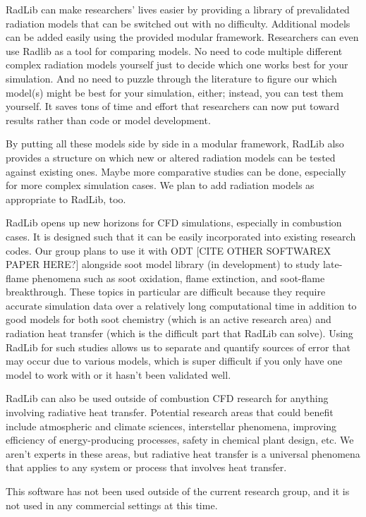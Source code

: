 \documentclass[preprint,12pt, a4paper]{elsarticle}
\begin{document}
RadLib can make researchers' lives easier by providing a library of prevalidated radiation models that can be switched out with no difficulty. Additional models can be added easily using the provided modular framework. Researchers can even use Radlib as a tool for comparing models. No need to code multiple different complex radiation models yourself just to decide which one works best for your simulation. And no need to puzzle through the literature to figure our which model(s) might be best for your simulation, either; instead, you can test them yourself. It saves tons of time and effort that researchers can now put toward results rather than code or model development. 

By putting all these models side by side in a modular framework, RadLib also provides a structure on which new or altered radiation models can be tested against existing ones. Maybe more comparative studies can be done, especially for more complex simulation cases. We plan to add radiation models as appropriate to RadLib, too. 

RadLib opens up new horizons for CFD simulations, especially in combustion cases. It is designed such that it can be easily incorporated into existing research codes. Our group plans to use it with ODT [CITE OTHER SOFTWAREX PAPER HERE?] alongside soot model library (in development) to study late-flame phenomena such as soot oxidation, flame extinction, and soot-flame breakthrough. These topics in particular are difficult because they require accurate simulation data over a relatively long computational time in addition to good models for both soot chemistry (which is an active research area) and radiation heat transfer (which is the difficult part that RadLib can solve). Using RadLib for such studies allows us to separate and quantify sources of error that may occur due to various models, which is super difficult if you only have one model to work with or it hasn't been validated well. 

RadLib can also be used outside of combustion CFD research for anything involving radiative heat transfer. Potential research areas that could benefit include atmospheric and climate sciences, interstellar phenomena, improving efficiency of energy-producing processes, safety in chemical plant design, etc. We aren't experts in these areas, but radiative heat transfer is a universal phenomena that applies to any system or process that involves heat transfer. 

This software has not been used outside of the current research group, and it is not used in any commercial settings at this time. 
\end{document}
